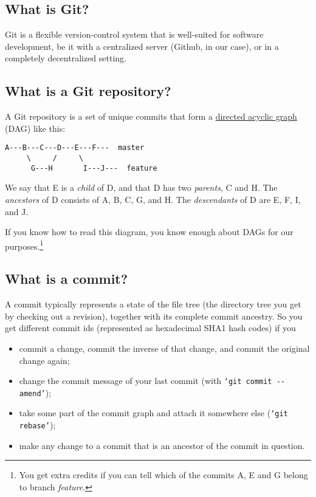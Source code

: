 \documentclass[12pt,pdftex]{article}
\begin{document}
\subsection{What is Git?}
\label{sec-2-1}

Git is a flexible version-control system that is well-suited for
software development, be it with a centralized server (Github, in our
case), or in a completely decentralized setting.


\subsection{What is a Git repository?}
\label{sec-2-2}

A Git repository is a set of unique commits that form a
\href{https://en.wikipedia.org/wiki/Directed_acyclic_graph}{directed acyclic graph} (DAG) like this:
\begin{verbatim}
A---B---C---D---E---F---  master
     \     /     \
      G---H       I---J---  feature
\end{verbatim}

We say that E is a \emph{child} of D, and that D has two
\emph{parents}, C and H.
The \emph{ancestors} of D consists of A, B, C, G, and H.
The \emph{descendants} of D are E, F, I, and J.

If you know how to read this diagram, you know enough about DAGs for
our purposes.\footnote{You get extra credits if you can tell which of the commits A, E and
G belong to branch \emph{feature}.}


\subsection{What is a commit?}
\label{sec-2-3}

A commit typically represents a state of the file tree (the directory
tree you get by checking out a revision), together with its complete
commit ancestry.
So you get different commit ids (represented as hexadecimal SHA1 hash
codes) if you
\begin{itemize}
\item commit a change, commit the inverse of that change, and commit the
original change again;
\item change the commit message of your last commit (with \texttt{‘git commit
     -{}-amend’});
\item take some part of the commit graph and attach it somewhere else
(\texttt{‘git rebase’});
\item make any change to a commit that is an ancestor of the commit in
question.
\end{itemize}
\end{document}
